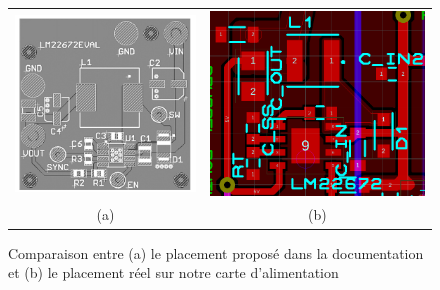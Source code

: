 				\begin{figure}[h]
					\begin{center}
						\begin{tabular}{c c}
							\includegraphics[scale=0.3]{../Illus/plct_lm_data.png}	&
							\includegraphics[scale=0.3]{../Illus/plct_lm_reel.png}	\\
							(a) & (b) \\
						\end{tabular}
					\end{center}
					\caption{Comparaison entre (a) le placement proposé dans la documentation
							et (b) le placement réel sur notre carte d'alimentation}
					\label{placement_lm}
				\end{figure}
				
